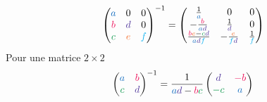 \documentclass[resume]{subfiles}
\begin{document}
$$\begin{pmatrix}
\textcolor{RoyalBlue}{a} & 0 & 0\\
\textcolor{OrangeRed}{b} & \textcolor{Violet}{d} & 0\\
\textcolor{ForestGreen}{c} & \textcolor{Orange}{e} & \textcolor{ProcessBlue}{f}
\end{pmatrix}^{-1}=\begin{pmatrix}
\frac{1}{\textcolor{RoyalBlue}{a}} & 0 & 0\\
-\frac{\textcolor{OrangeRed}{b}}{\textcolor{RoyalBlue}{a}\textcolor{Violet}{d}} & \frac{1}{\textcolor{Violet}{d}} & 0\\
\frac{\textcolor{OrangeRed}{b}\textcolor{Orange}{e}-\textcolor{ForestGreen}{c}\textcolor{Violet}{d}}{\textcolor{RoyalBlue}{a}\textcolor{Violet}{d}\textcolor{ProcessBlue}{f}} & -\frac{\textcolor{Orange}{e}}{\textcolor{ProcessBlue}{f}\textcolor{Violet}{d}} &
\frac{1}{\textcolor{ProcessBlue}{f}}
\end{pmatrix}$$
Pour une matrice $2\times 2$
$$\begin{pmatrix}
\textcolor{RoyalBlue}{a} & \textcolor{OrangeRed}{b}\\
\textcolor{ForestGreen}{c} & \textcolor{Violet}{d}
\end{pmatrix}^{-1}=\frac{1}{\textcolor{RoyalBlue}{a}\textcolor{Violet}{d}-\textcolor{OrangeRed}{b}\textcolor{ForestGreen}{c}}\begin{pmatrix}
\textcolor{Violet}{d} & \textcolor{OrangeRed}{-b}\\
\textcolor{ForestGreen}{-c} & \textcolor{RoyalBlue}{a}
\end{pmatrix}$$
\end{document}
